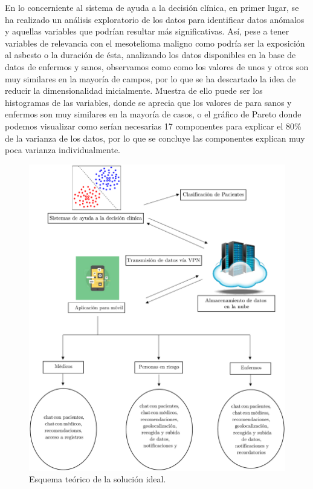\documentclass{article}
\begin{document}
En lo concerniente al sistema de  ayuda  a  la	decisión  clínica,  en
primer lugar, se ha realizado un análisis exploratorio	de  los  datos
para identificar datos	anómalos  y  aquellas  variables  que  podrían
resultar más significativas. Así, pese a tener variables de relevancia
con el mesotelioma maligno como podría ser la exposición al asbesto  o
la duración de ésta, analizando los datos disponibles en  la  base  de
datos de enfermos y sanos, observamos como como los valores de unos  y
otros son muy similares en la mayoría de campos,  por  lo  que	se  ha
descartado la idea de reducir la dimensionalidad inicialmente. Muestra
de ello puede ser los histogramas de las variables, donde  se  aprecia
que los valores de para sanos y  enfermos  son	muy  similares	en  la
mayoría de casos, o el gráfico de Pareto donde podemos visualizar como
serían necesarias 17 componentes para explicar el 80\% de la  varianza
de los datos, por lo que se concluye las componentes explican muy poca
varianza individualmente.

\vfill

\begin{figure}[h]
\centering
\includegraphics[width = \linewidth]{../images/esquemaideal.pdf}
\caption{Esquema teórico de la solución ideal.}
\end{figure}
\end{document}
